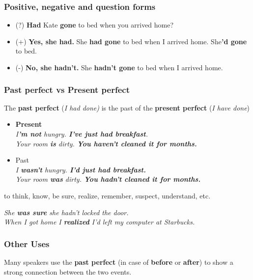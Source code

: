 \documentclass[hidelinks,10pt,a4paper]{article}
\begin{document}
\subsubsection{Positive, negative and question forms}

\begin{itemize}
	\item (?) \textbf{Had} Kate \textbf{gone} to bed when you arrived home?
	\item (+) \textbf{Yes, she had.} She \textbf{had gone} to bed when I arrived home. She\textbf{'d gone} to bed.
	\item (-) \textbf{No, she hadn't.} She \textbf{hadn't gone} to bed when I arrived home.
\end{itemize}

\subsubsection{Past perfect vs Present perfect}
The \textbf{past perfect} (\textit{I had done)}  is the past of the \textbf{present perfect} (\textit{I have done})

\begin{itemize}
	\item \textbf{Present} \\
		\textit{I\textbf{'m not} hungry. \textbf{I've just had breakfast}. \\
		Your room \textbf{is} dirty. \textbf{You haven't cleaned it for months.} }
	\item Past \\
		\textit{I \textbf{wasn't} hungry. \textbf{I'd just had breakfast.} \\
		Your room \textbf{was} dirty. \textbf{You hadn't cleaned it for months.} }
\end{itemize}


to think, know, be sure, realize, remember, suspect, understand, etc.

\begin{center}
	\textit{She \textbf{was sure} she hadn't locked the door. \\
	When I got home I \textbf{realized} I'd left my computer at Starbucks.}
\end{center}

\subsubsection{Other Uses}
Many speakers use the \textbf{past perfect} (in case of \textbf{before} or \textbf{after}) to show a strong connection between the two events.
\end{document}
